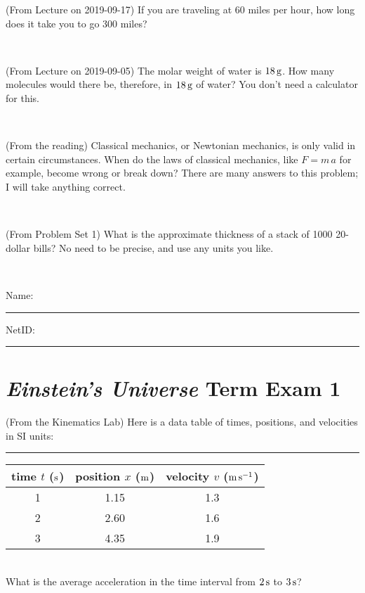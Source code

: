 \documentclass[12pt, letterpaper]{article}
\begin{document}
\clearpage


\begin{problem} (From Lecture on 2019-09-17)
If you are traveling at 60 miles per hour, how long does
it take you to go 300 miles?
\end{problem}


\vfill ~

\begin{problem} (From Lecture on 2019-09-05)
The molar weight of water is $18\,\mathrm{g}$. How many molecules would there
be, therefore, in $18\,\mathrm{g}$ of water? You don't need a calculator for
this.
\end{problem}


\vfill ~

\begin{problem} (From the reading)
Classical mechanics, or Newtonian mechanics, is only valid in certain
circumstances. When do the laws of classical mechanics, like $F =
m\,a$ for example, become wrong or break down? There are many answers
to this problem; I will take anything correct.
\end{problem}


\vfill ~

\begin{problem} (From Problem Set 1)
What is the approximate thickness of a stack of 1000 20-dollar bills?
No need to be precise, and use any units you like.
\end{problem}


\vfill ~


\cleardoublepage



\noindent
Name: \rule[-1ex]{0.60\textwidth}{0.1pt}
NetID: \rule[-1ex]{0.20\textwidth}{0.1pt}

\section*{\textsl{Einstein's Universe} Term Exam 1}
\setcounter{problem}{1}


\begin{problem} (From the Kinematics Lab)
Here is a data table of times, positions, and velocities in SI units:\\
\rule{1.0in}{0pt}\begin{tabular}{c|c|c}
time $t$ ($\mathrm{s}$) & position $x$ ($\mathrm{m}$) & velocity $v$ ($\mathrm{m}\,\mathrm{s}^{-1}$) \\
\hline
1 & 1.15 & 1.3 \\
2 & 2.60 & 1.6 \\
3 & 4.35 & 1.9 \\
\hline
\end{tabular}\\
What is the average acceleration in the time interval from $2\,\mathrm{s}$ to $3\,\mathrm{s}$?
\end{problem}
\end{document}

